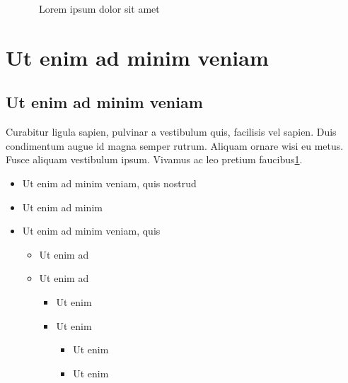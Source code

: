 \begin{figure}
{}
  \caption{~Lorem ipsum dolor sit amet}\label{img:index}
\end{figure}

\section{Ut enim ad minim veniam}

\lipsum[2-4]

\subsection{Ut enim ad minim veniam}

Curabitur ligula sapien, pulvinar a vestibulum quis, facilisis vel sapien. Duis condimentum augue id magna semper rutrum. Aliquam ornare wisi eu metus. Fusce aliquam vestibulum ipsum. Vivamus ac leo pretium faucibus\ref{img:index}.

\begin{itemize}
  \item Ut enim ad minim veniam, quis nostrud
  \item Ut enim ad minim
  \item Ut enim ad minim veniam, quis
        \begin{itemize}
          \item Ut enim ad
          \item Ut enim ad
                \begin{itemize}
                  \item Ut enim
                  \item Ut enim
                        \begin{itemize}
                          \item Ut enim
                          \item Ut enim
                        \end{itemize}
                \end{itemize}
        \end{itemize}
\end{itemize}

